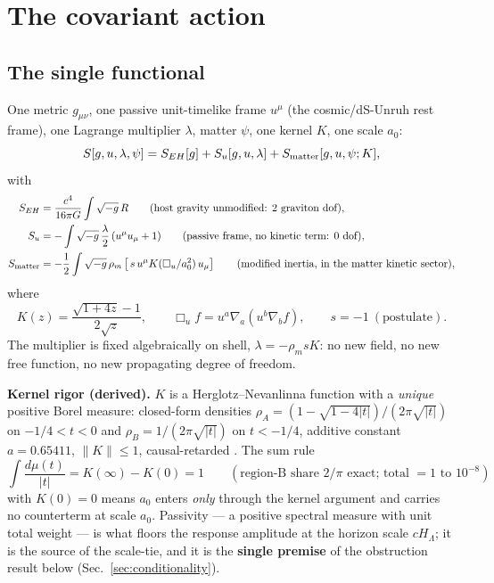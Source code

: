 \documentclass[11pt]{article}
\newcommand{\Boxu}{\Box_u}
\begin{document}
\section{The covariant action}\label{sec:action}

\subsection{The single functional}

One metric $g_{\mu\nu}$, one passive unit-timelike frame $u^\mu$ (the cosmic/dS-Unruh rest frame), one Lagrange multiplier $\lambda$, matter $\psi$, one kernel $K$, one scale $a_0$:
\begin{equation}
S[g,u,\lambda,\psi]=S_{EH}[g]+S_u[g,u,\lambda]+S_{\rm matter}[g,u,\psi;K],
\end{equation}
with
\begin{align}
S_{EH}&=\frac{c^4}{16\pi G}\int\sqrt{-g}\,R \qquad\text{(host gravity unmodified: 2 graviton dof)},\\
S_u&=-\int\sqrt{-g}\,\frac{\lambda}{2}\,(u^\mu u_\mu+1) \qquad\text{(passive frame, no kinetic term: 0 dof)},\\
S_{\rm matter}&=-\frac12\int\sqrt{-g}\,\rho_m\left[\,s\,u^\mu K(\Boxu/a_0^2)\,u_\mu\right] \qquad\text{(modified inertia, in the matter kinetic sector)},
\end{align}
where
\begin{equation}
K(z)=\frac{\sqrt{1+4z}-1}{2\sqrt z},\qquad \Boxu f=u^a\nabla_a(u^b\nabla_b f),\qquad s=-1\ (\text{postulate}).
\end{equation}
The multiplier is fixed algebraically on shell, $\lambda=-\rho_m sK$: no new field, no new free function, no new propagating degree of freedom.

\textbf{Kernel rigor (derived).} $K$ is a Herglotz--Nevanlinna function with a \emph{unique} positive Borel measure: closed-form densities $\rho_A=(1-\sqrt{1-4|t|})/(2\pi\sqrt{|t|})$ on $-1/4<t<0$ and $\rho_B=1/(2\pi\sqrt{|t|})$ on $t<-1/4$, additive constant $a=0.65411$, $\|K\|\le1$, causal-retarded \cite{zv4,zv11}. The sum rule
\begin{equation}
\int\frac{d\mu(t)}{|t|}=K(\infty)-K(0)=1\qquad(\text{region-B share }2/\pi\text{ exact; total }=1\text{ to }10^{-8})
\end{equation}
with $K(0)=0$ means $a_0$ enters \emph{only} through the kernel argument and carries no counterterm at scale $a_0$. Passivity --- a positive spectral measure with unit total weight --- is what floors the response amplitude at the horizon scale $cH_\Lambda$; it is the source of the scale-tie, and it is the \textbf{single premise} of the obstruction result below (Sec.~\ref{sec:conditionality}).
\end{document}
